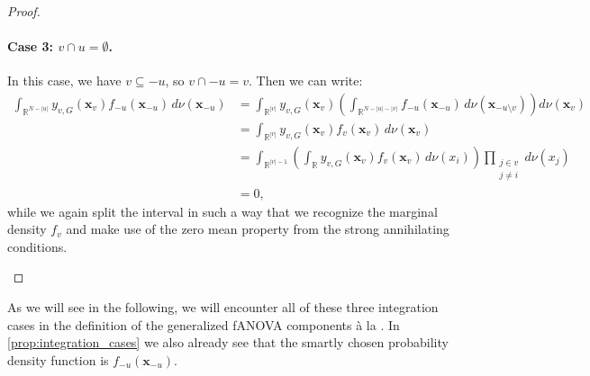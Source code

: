 \begin{proof}
\paragraph{Case 3: \( v \cap u = \emptyset \).}
In this case, we have \( v \subseteq -u \), so \( v \cap -u = v \). Then we can write:
\[
\begin{aligned}
\int_{\mathbb{R}^{N - |u|}} y_{v,G}(\boldsymbol{x}_v) f_{-u}(\boldsymbol{x}_{-u}) \, d \nu(\boldsymbol{x}_{-u})
&= \int_{\mathbb{R}^{|v|}} y_{v,G}(\boldsymbol{x}_v)
\left( \int_{\mathbb{R}^{N - |u| - |v|}} f_{-u}(\boldsymbol{x}_{-u}) \, d \nu(\boldsymbol{x}_{-u \setminus v}) \right)
d \nu(\boldsymbol{x}_v) \\
&= \int_{\mathbb{R}^{|v|}} y_{v,G}(\boldsymbol{x}_v) f_v(\boldsymbol{x}_v) \, d \nu(\boldsymbol{x}_v) \\
&= \int_{\mathbb{R}^{|v|-1}} \left( \int_{\mathbb{R}} y_{v,G}(\boldsymbol{x}_v) f_v(\boldsymbol{x}_v) \, d \nu(x_i) \right)
\prod_{\substack{j \in v \\ j \ne i}} d \nu (x_j) \\
&= 0,
\end{aligned}
\]
while we again split the interval in such a way that we recognize the marginal density $f_v$ and make use of the zero mean property from the strong annihilating conditions.
\begin{center}
\end{center}

\end{proof}

As we will see in the following, we will encounter all of these three integration cases in the definition of the generalized fANOVA components à la \cite{rahman2014}.
In \autoref{prop:integration_cases} we also already see that the smartly chosen probability density function is $f_{-u}(\boldsymbol{x}_{-u})$.



